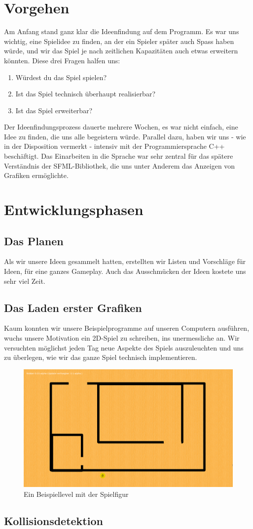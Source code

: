 \documentclass[12pt,a4paper]{scrartcl}
\begin{document}
\section{Vorgehen}
Am Anfang stand ganz klar die Ideenfindung auf dem Programm. Es war uns wichtig,
eine Spielidee zu finden, an der ein Spieler später auch Spass haben würde,
und wir das Spiel je nach zeitlichen Kapazitäten auch etwas erweitern könnten.
Diese drei Fragen halfen uns:
\begin{enumerate}
\item Würdest du das Spiel spielen?
\item Ist das Spiel technisch überhaupt realisierbar?
\item Ist das Spiel erweiterbar?
\end{enumerate}
Der Ideenfindungsprozess dauerte mehrere Wochen, es war nicht einfach, eine Idee
zu finden, die uns alle begeistern würde. Parallel dazu, haben wir uns - wie in der
Disposition vermerkt - intensiv mit der Programmiersprache C++ beschäftigt. Das Einarbeiten
in die Sprache war sehr zentral für das spätere Verständnis der SFML-Bibliothek, die uns
unter Anderem das Anzeigen von Grafiken ermöglichte.

\section{Entwicklungsphasen}
\subsection{Das Planen}
Als wir unsere Ideen gesammelt hatten, erstellten wir Listen und Vorschläge für Ideen, für
eine ganzes Gameplay. Auch das Ausschmücken der Ideen kostete uns sehr viel Zeit.
\subsection{Das Laden erster Grafiken}
Kaum konnten wir unsere Beispielprogramme auf unseren Computern ausführen, wuchs unsere Motivation
ein 2D-Spiel zu schreiben, ins unermessliche an. Wir versuchten möglichst jeden Tag neue Aspekte
des Spiels auszuleuchten und uns zu überlegen, wie wir das ganze Spiel technisch implementieren.
\begin{figure}[h]
\centering
\includegraphics[scale=0.25]{img/grafiken.png}
\caption{Ein Beispiellevel mit der Spielfigur}
\end{figure}
\subsection{Kollisionsdetektion}
\end{document}
